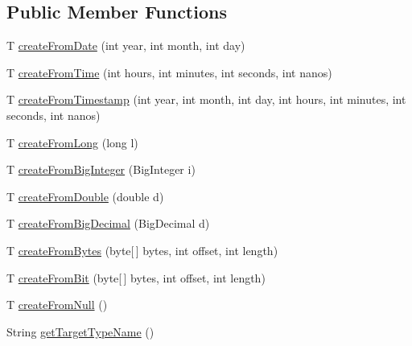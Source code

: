 \subsection*{Public Member Functions}
\begin{DoxyCompactItemize}
\item 
T \mbox{\hyperlink{interfacecom_1_1mysql_1_1cj_1_1result_1_1_value_factory_a5c7828e8fe372c9070e0e64ddafac761}{create\+From\+Date}} (int year, int month, int day)
\item 
T \mbox{\hyperlink{interfacecom_1_1mysql_1_1cj_1_1result_1_1_value_factory_a5edf0bed225d34bd1fade72d8f106760}{create\+From\+Time}} (int hours, int minutes, int seconds, int nanos)
\item 
T \mbox{\hyperlink{interfacecom_1_1mysql_1_1cj_1_1result_1_1_value_factory_accbdc6c6970a22e40a0b1d72213334e6}{create\+From\+Timestamp}} (int year, int month, int day, int hours, int minutes, int seconds, int nanos)
\item 
T \mbox{\hyperlink{interfacecom_1_1mysql_1_1cj_1_1result_1_1_value_factory_a48c32868f2e3efac502522211a40f642}{create\+From\+Long}} (long l)
\item 
T \mbox{\hyperlink{interfacecom_1_1mysql_1_1cj_1_1result_1_1_value_factory_a8b18f90981ce59ba61491c945b2820fe}{create\+From\+Big\+Integer}} (Big\+Integer i)
\item 
T \mbox{\hyperlink{interfacecom_1_1mysql_1_1cj_1_1result_1_1_value_factory_a9977e0c9d2bb9e306ee4a5a2ead6840c}{create\+From\+Double}} (double d)
\item 
T \mbox{\hyperlink{interfacecom_1_1mysql_1_1cj_1_1result_1_1_value_factory_ab4acc647cdd39297d8bad28339a8ef18}{create\+From\+Big\+Decimal}} (Big\+Decimal d)
\item 
T \mbox{\hyperlink{interfacecom_1_1mysql_1_1cj_1_1result_1_1_value_factory_a0724fcd13ef1ef07c781a61167847a11}{create\+From\+Bytes}} (byte\mbox{[}$\,$\mbox{]} bytes, int offset, int length)
\item 
T \mbox{\hyperlink{interfacecom_1_1mysql_1_1cj_1_1result_1_1_value_factory_a23ac617a66fbf713243dd67ab04d30e6}{create\+From\+Bit}} (byte\mbox{[}$\,$\mbox{]} bytes, int offset, int length)
\item 
T \mbox{\hyperlink{interfacecom_1_1mysql_1_1cj_1_1result_1_1_value_factory_a56a65ddc42f449859a1dedb6395016cf}{create\+From\+Null}} ()
\item 
String \mbox{\hyperlink{interfacecom_1_1mysql_1_1cj_1_1result_1_1_value_factory_a54de50a710778bcff410434107d34036}{get\+Target\+Type\+Name}} ()
\end{DoxyCompactItemize}


